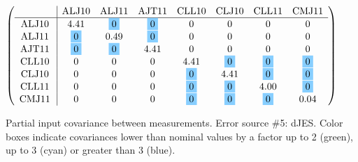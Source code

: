 \begin{table}[H]
\scriptsize
\begin{center}
\renewcommand{\arraystretch}{1.1}
\begin{math}\left(\begin{array}{c|ccccccc}
 & \mathrm{ALJ10} & 
\mathrm{ALJ11} & 
\mathrm{AJT11} & 
\mathrm{CLL10} & 
\mathrm{CLJ10} & 
\mathrm{CLL11} & 
\mathrm{CMJ11} \\
\hline
\mathrm{ALJ10} \hspace*{2pt} &       4.41 &  \colorbox{SkyBlue1}{$ 0$} &  \colorbox{SkyBlue1}{$ 0$} &  0 &  0 &  0 &  0 \\
\mathrm{ALJ11} \hspace*{2pt} &  \colorbox{SkyBlue1}{$ 0$} &       0.49 &  \colorbox{SkyBlue1}{$ 0$} &  0 &  0 &  0 &  0 \\
\mathrm{AJT11} \hspace*{2pt} &  \colorbox{SkyBlue1}{$ 0$} &  \colorbox{SkyBlue1}{$ 0$} &       4.41 &  0 &  0 &  0 &  0 \\
\mathrm{CLL10} \hspace*{2pt} &  0 &  0 &  0 &       4.41 &  \colorbox{SkyBlue1}{$ 0$} &  \colorbox{SkyBlue1}{$ 0$} &  \colorbox{SkyBlue1}{$ 0$} \\
\mathrm{CLJ10} \hspace*{2pt} &  0 &  0 &  0 &  \colorbox{SkyBlue1}{$ 0$} &       4.41 &  \colorbox{SkyBlue1}{$ 0$} &  \colorbox{SkyBlue1}{$ 0$} \\
\mathrm{CLL11} \hspace*{2pt} &  0 &  0 &  0 &  \colorbox{SkyBlue1}{$ 0$} &  \colorbox{SkyBlue1}{$ 0$} &       4.00 &  \colorbox{SkyBlue1}{$ 0$} \\
\mathrm{CMJ11} \hspace*{2pt} &  0 &  0 &  0 &  \colorbox{SkyBlue1}{$ 0$} &  \colorbox{SkyBlue1}{$ 0$} &  \colorbox{SkyBlue1}{$ 0$} &       0.04 \\
\end{array}\right)\end{math}
\caption{Partial input covariance between measurements. Error source \#5: dJES. Color boxes indicate covariances lower than nominal values by a factor up to 2 (green), up to 3 (cyan) or greater than 3 (blue).}
\renewcommand{\arraystretch}{1}
\end{center}
\end{table}

